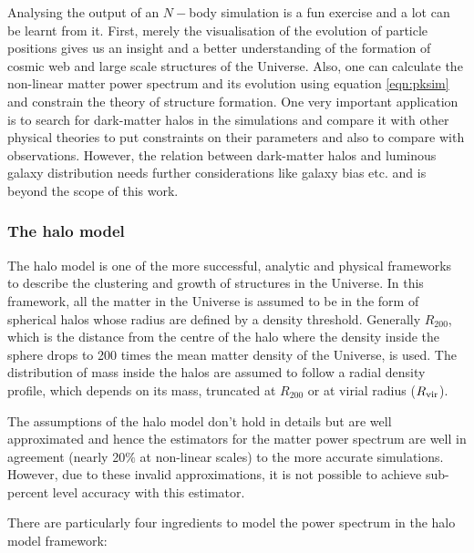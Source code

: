 Analysing the output of an $N-$body simulation is a fun exercise and a lot can be learnt
from it. First, merely the visualisation of the evolution of particle positions gives
us an insight and a better understanding of the formation of cosmic web and large
scale structures of the Universe. 
Also, one can calculate the non-linear matter power spectrum and its evolution 
using equation \ref{eqn:pksim} and constrain the theory of structure formation. One very important
application is to search for dark-matter halos in the simulations and compare
it with other physical theories to put constraints on their parameters and also
to compare with observations. However, the relation between dark-matter halos
and luminous galaxy distribution needs further considerations like galaxy 
bias etc. and is beyond the scope of this work. 




\subsubsection{The halo model}

The halo model \cite{1977ApJ...217..331M,2000ApJ...543..503M,2000MNRAS.318.1144P,2000MNRAS.318..203S} 
is one of the more successful, analytic and physical frameworks to describe
the clustering and growth of structures in the Universe. In this framework, all the matter
in the Universe is assumed to be in the form of spherical halos whose radius are defined by a 
density threshold. Generally $R_{200}$, which is the distance from the centre of the halo where
the density inside the sphere drops to 200 times the mean matter density of the Universe, is used. 
The  distribution of mass inside the halos are assumed to follow a radial density 
profile, which depends on its mass, truncated at $R_{200}$ or at virial 
radius ($R_{\rm vir}$).

The assumptions of the halo model don't hold in details but are well approximated and 
hence the estimators for the matter power spectrum are well in agreement 
(nearly 20$\%$ at non-linear scales)
to the more accurate simulations. However, due to these invalid approximations, it is not
possible to achieve sub-percent level accuracy with this estimator. 

There are particularly four ingredients to model the power spectrum in the halo model framework:


